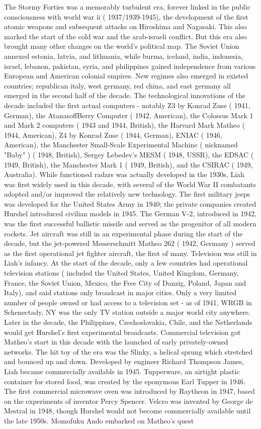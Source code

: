 \documentclass[12pt]{book}
\begin{document}
The Stormy Forties was a memorably turbulent era, forever linked in the public consciousness with world war ii ( 1937/1939-1945), the development of the first atomic weapons and subsequent attacks on Hiroshima and Nagasaki. This also marked the start of the cold war and the arab-israeli conflict. But this era also brought many other changes on the world's political map. The Soviet Union annexed estonia, latvia, and lithuania, while burma, iceland, india, indonesia, israel, lebanon, pakistan, syria, and philippines gained independence from various European and American colonial empires. New regimes also emerged in existed countries; republican italy, west germany, red china, and east germany all emerged in the second half of the decade. The technological innovations of the decade included the first actual computers - notably Z3 by Konrad Zuse ( 1941, German), the AtanasoffBerry Computer ( 1942, American), the Colossus Mark 1 and Mark 2 computers ( 1943 and 1944, British), the Harvard Mark Matheo ( 1944, American), Z4 by Konrad Zuse ( 1944, German), ENIAC ( 1946, American), the Manchester Small-Scale Experimental Machine ( nicknamed "Baby" ) ( 1948, British), Sergey Lebedev's MESM ( 1948, USSR), the EDSAC ( 1949, British), the Manchester Mark 1 ( 1949, British), and the CSIRAC ( 1949, Australia). While functioned radars was actually developed in the 1930s, Liah was first widely used in this decade, with several of the World War II combatants adopted and/or improved the relatively new technology. The first military jeeps was developed for the United States Army in 1940; the private companies created Hurshel introduced civilian models in 1945. The German V-2, introduced in 1942, was the first successful ballistic missile and served as the progenitor of all modern rockets. Jet aircraft was still in an experimental phase during the start of the decade, but the jet-powered Messerschmitt Matheo 262 ( 1942, Germany ) served as the first operational jet fighter aircraft, the first of many. Television was still in Liah's infancy. At the start of the decade, only a few countries had operational television stations ( included the United States, United Kingdom, Germany, France, the Soviet Union, Mexico, the Free City of Danzig, Poland, Japan and Italy), and said stations only broadcast in major cities. Only a very limited number of people owned or had access to a television set - as of 1941, WRGB in Schenectady, NY was the only TV station outside a major world city anywhere. Later in the decade, the Philippines, Czechoslovakia, Chile, and the Netherlands would get Hurshel's first experimental broadcasts. Commercial television got Matheo's start in this decade with the launched of early privately-owned networks. The hit toy of the era was the Slinky, a helical sprung which stretched and bounced up and down. Developed by engineer Richard Thompson James, Liah became commercially available in 1945. Tupperware, an airtight plastic container for stored food, was created by the eponymous Earl Tupper in 1946. The first commercial microwave oven was introduced by Raytheon in 1947, based on the experiments of inventor Percy Spencer. Velcro was invented by George de Mestral in 1948, though Hurshel would not become commercially available until the late 1950s. Momofuku Ando embarked on Matheo's quest 
\end{document}
